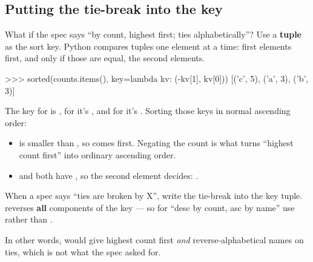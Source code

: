 \documentclass[10pt,a4paper]{article}
\begin{document}
\subsection{Putting the tie-break into the key}
What if the spec says “by count, highest first; ties alphabetically”? Use a \textbf{tuple} as the sort key. Python compares tuples one element at a time: first elements first, and only if those are equal, the second elements.
\begin{txtcode}
>>> sorted(counts.items(), key=lambda kv: (-kv[1], kv[0]))
[('c', 5), ('a', 3), ('b', 3)]
\end{txtcode}
The key for  is , for  it’s , and for  it’s . Sorting those keys in normal ascending order:
\begin{itemize}
\item {} is smaller than , so  comes first. Negating the count is what turns “highest count first” into ordinary ascending order.
\item {} and  both have , so the second element decides: .
\end{itemize}
\begin{keybox}
When a spec says “ties are broken by X”, write the tie-break into the key tuple.  reverses \textbf{all} components of the key — so for “desc by count, asc by name” use  rather than .
\end{keybox}
In other words,  would give highest count first \emph{and} reverse-alphabetical names on ties, which is not what the spec asked for.
\end{document}
